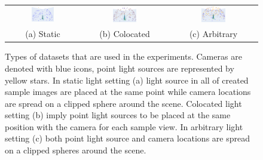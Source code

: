 \begingroup
\begin{figure}[!htb]
    \centering
    \begin{tabular*}{\textwidth}{ c c c }
          \includegraphics[width=0.32\textwidth]{figures/light_settings/static_setting.png}
        & \includegraphics[width=0.29\textwidth]{figures/light_settings/colocated_setting.png}
        & \includegraphics[width=0.29\textwidth]{figures/light_settings/arbitrary_setting.png} \\
        (a) Static & (b) Colocated & (c) Arbitrary
    \end{tabular*}
    \caption{Types of datasets that are used in the experiments.
    Cameras are denoted with blue icons, point light sources are represented by yellow stars.
    In static light setting (a) light source in all of created sample images are placed at the same point
    while camera locations are spread on a clipped sphere around the scene.
    Colocated light setting (b) imply point light sources to be placed at the same position with the camera for each sample view.
    In arbitrary light setting (c) both point light source and camera locations are spread on a clipped spheres around the scene.}
    \label{fig:light_settings}
\end{figure}
\endgroup